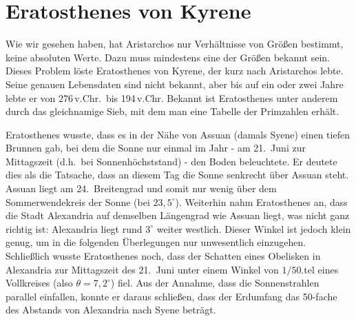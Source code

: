 \section{Eratosthenes von Kyrene}
\label{sec_Eratosthenes}

Wie wir gesehen haben, hat Aristarchos nur Verh\"altnisse von Gr\"o\ss en bestimmt, keine
absoluten Werte. Dazu muss mindestens eine der Gr\"o\ss en bekannt sein. 
Dieses
Problem l\"oste Eratosthenes von Kyrene, der kurz nach Aristarchos lebte. Seine genauen
Lebensdaten sind nicht bekannt, aber bis auf ein oder zwei Jahre lebte er von 276\,v.Chr.\ bis
194\,v.Chr. Bekannt ist Eratosthenes unter anderem durch das gleichnamige \glqq Sieb\grqq, mit dem man 
eine Tabelle der Primzahlen erh\"alt. 

Eratosthenes wusste, dass es in der N\"ahe von Assuan (damals Syene) einen tiefen Brunnen
gab, bei dem die Sonne nur einmal im Jahr - am 21.\ Juni zur Mittagszeit 
(d.h.\ bei Sonnenh\"ochststand) - den Boden beleuchtete. Er deutete dies 
als die Tatsache, dass an diesem Tag die Sonne senkrecht \"uber Assuan steht. Assuan liegt am
24.\ Breitengrad und somit nur wenig \"uber dem Sommerwendekreis der Sonne (bei $23,5^\circ$). 
Weiterhin nahm Eratosthenes an, dass die Stadt Alexandria auf demselben L\"angengrad wie
Assuan liegt, was nicht ganz richtig ist: Alexandria liegt rund $3^\circ$ weiter westlich. Dieser
Winkel ist jedoch klein genug, um in die
folgenden \"Uberlegungen nur unwesentlich einzugehen. 
Schlie\ss lich wusste Eratosthenes noch, dass der Schatten eines Obelisken in Alexandria zur
Mittagszeit des 21.\ Juni unter einem Winkel von $1/50$.tel eines Vollkreises (also $\theta=7,2^\circ$) fiel. 
Aus der Annahme, dass die Sonnenstrahlen parallel einfallen, konnte er daraus 
schlie\ss en, dass der Erdumfang das 50-fache des Abstands von Alexandria nach Syene 
betr\"agt. 

